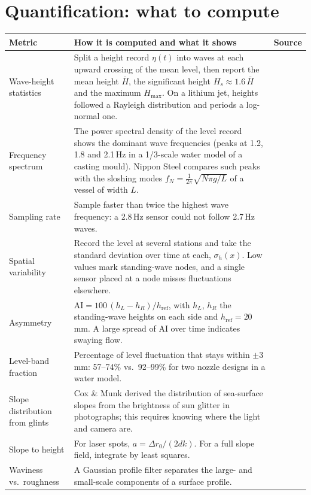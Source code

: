 \documentclass[10pt,letterpaper]{article}
\makeatletter
\newcommand{\lc}[1]{[\def\lc@sep{}\@for\lc@k:=#1\do{\lc@sep\def\lc@sep{,\,}%
  \href{\csname refurl@\lc@k\endcsname}{\begin{NoHyper}\citenum{\lc@k}\end{NoHyper}}}]}
\makeatother
\begin{document}
\section{Quantification: what to compute}
{\small
\begin{tabularx}{\textwidth}{@{}>{\raggedright}p{2.6cm}X>{\raggedright\arraybackslash}p{1.9cm}@{}}
\toprule
Metric & How it is computed and what it shows & Source \\
\midrule
Wave-height statistics & Split a height record $\eta(t)$ into waves at each upward crossing of the mean level, then report the mean height $\bar H$, the significant height $H_s\approx1.6\,\bar H$ and the maximum $H_{\max}$. On a lithium jet, heights followed a Rayleigh distribution and periods a log-normal one. & \lc{kanemura16,kanemura14} \\
\addlinespace
Frequency spectrum & The power spectral density of the level record shows the dominant wave frequencies (peaks at 1.2, 1.8 and 2.1\,Hz in a 1/3-scale water model of a casting mould). Nippon Steel compares such peaks with the sloshing modes $f_N=\tfrac{1}{2\pi}\sqrt{N\pi g/L}$ of a vessel of width $L$. & \lc{miranda,suzuki} \\
\addlinespace
Sampling rate & Sample faster than twice the highest wave frequency: a 2.8\,Hz sensor could not follow 2.7\,Hz waves. & \lc{zurner} \\
\addlinespace
Spatial variability & Record the level at several stations and take the standard deviation over time at each, $\sigma_h(x)$. Low values mark standing-wave nodes, and a single sensor placed at a node misses fluctuations elsewhere. & \lc{cho} \\
\addlinespace
Asymmetry & $\mathrm{AI}=100\,(h_L-h_R)/h_{\mathrm{ref}}$, with $h_L$, $h_R$ the standing-wave heights on each side and $h_{\mathrm{ref}}=20$\,mm. A large spread of AI over time indicates swaying flow. & \lc{seden} \\
\addlinespace
Level-band fraction & Percentage of level fluctuation that stays within $\pm3$\,mm: 57--74\% vs.\ 92--99\% for two nozzle designs in a water model. & \lc{xu24} \\
\addlinespace
Slope distribution from glints & Cox \& Munk derived the distribution of sea-surface slopes from the brightness of sun glitter in photographs; this requires knowing where the light and camera are. & \lc{coxmunk} \\
\addlinespace
Slope to height & For laser spots, $a=\Delta r_0/(2dk)$. For a full slope field, integrate by least squares. & \lc{ji,moisy,jain} \\
\addlinespace
Waviness vs.\ roughness & A Gaussian profile filter separates the large- and small-scale components of a surface profile. & \lc{iso} \\
\bottomrule
\end{tabularx}}
\end{document}
